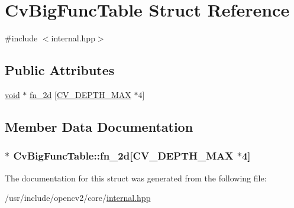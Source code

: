 \hypertarget{structCvBigFuncTable}{\section{Cv\-Big\-Func\-Table Struct Reference}
\label{structCvBigFuncTable}
}


{\ttfamily \#include $<$internal.\-hpp$>$}

\subsection*{Public Attributes}
\begin{DoxyCompactItemize}
\item 
\hyperlink{legacy_8hpp_a8bb47f092d473522721002c86c13b94e}{void} $\ast$ \hyperlink{structCvBigFuncTable_a1f52bd8e394f94b004170586ae3a52b0}{fn\-\_\-2d} \mbox{[}\hyperlink{core_2types__c_8h_acba5122a909469622bb5398aac729910}{C\-V\-\_\-\-D\-E\-P\-T\-H\-\_\-\-M\-A\-X} $\ast$4\mbox{]}
\end{DoxyCompactItemize}


\subsection{Member Data Documentation}
\hypertarget{structCvBigFuncTable_a1f52bd8e394f94b004170586ae3a52b0}{
\subsubsection[{fn\-\_\-2d}]{$\ast$ Cv\-Big\-Func\-Table\-::fn\-\_\-2d\mbox{[}{\bf C\-V\-\_\-\-D\-E\-P\-T\-H\-\_\-\-M\-A\-X} $\ast$4\mbox{]}}}\label{structCvBigFuncTable_a1f52bd8e394f94b004170586ae3a52b0}


The documentation for this struct was generated from the following file\-:\begin{DoxyCompactItemize}
\item 
/usr/include/opencv2/core/\hyperlink{internal_8hpp}{internal.\-hpp}\end{DoxyCompactItemize}
